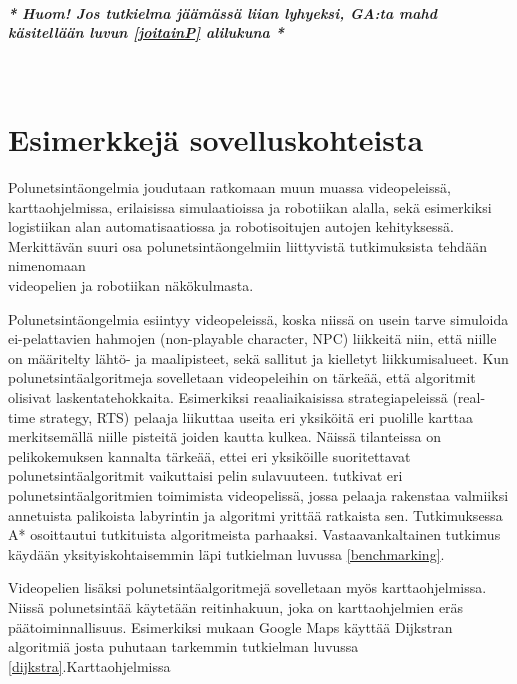 \paragraph{\textit{* Huom! Jos tutkielma jäämässä liian lyhyeksi, GA:ta mahd käsitellään luvun \ref{joitainP} alilukuna *}}\mbox{}
\\

\section{Esimerkkejä sovelluskohteista}\label{eSuovelluskohteista}
Polunetsintäongelmia joudutaan ratkomaan muun muassa videopeleissä, 
karttaohjelmissa, erilaisissa simulaatioissa ja robotiikan alalla,
\cite{ACMHindawi} sekä esimerkiksi logistiikan alan automatisaatiossa ja 
robotisoitujen autojen kehityksessä.\cite{arXivMAPF} Merkittävän suuri 
osa polunetsintäongelmiin liittyvistä tutkimuksista tehdään nimenomaan 
\\videopelien\cite{MathewAndMalathy}\cite{ACMHindawi}\cite{mazeGameTrilogi}
ja robotiikan\cite{ACMHindawi}\cite{DelaunayVoronoiAStar} näkökulmasta.\par
	Polunetsintäongelmia esiintyy videopeleissä, koska niissä on usein 
tarve simuloida ei-pelattavien hahmojen (non-playable character, NPC) 
liikkeitä niin, että niille on määritelty lähtö- ja maalipisteet, sekä 
sallitut ja kielletyt liikkumisalueet. Kun polunetsintäalgoritmeja 
sovelletaan videopeleihin on tärkeää, että algoritmit olisivat 
laskentatehokkaita. Esimerkiksi reaaliaikaisissa strategiapeleissä 
(real-time strategy, RTS) pelaaja liikuttaa useita eri yksiköitä eri puolille 
karttaa merkitsemällä niille pisteitä joiden kautta kulkea. Näissä 
tilanteissa on pelikokemuksen kannalta tärkeää, ettei eri yksiköille 
suoritettavat polunetsintäalgoritmit vaikuttaisi pelin 
sulavuuteen.\cite{MathewAndMalathy} \textcite{mazeGameTrilogi} tutkivat 
eri polunetsintäalgoritmien toimimista videopelissä, jossa pelaaja rakenstaa 
valmiiksi annetuista palikoista labyrintin ja algoritmi yrittää ratkaista 
sen. Tutkimuksessa A* osoittautui tutkituista algoritmeista parhaaksi. 
Vastaavankaltainen tutkimus käydään yksityiskohtaisemmin läpi tutkielman 
luvussa \ref{benchmarking}. \par
	Videopelien lisäksi polunetsintäalgoritmejä sovelletaan myös 
karttaohjelmissa. Niissä polunetsintää käytetään reitinhakuun, joka on 
karttaohjelmien eräs päätoiminnallisuus. Esimerkiksi 
\textcite{applSciLawande} mukaan Google Maps käyttää Dijkstran algoritmiä 
josta puhutaan tarkemmin tutkielman luvussa \ref{dijkstra}.Karttaohjelmissa 
